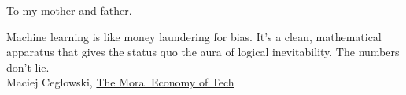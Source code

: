 

\copyrightpage  %

\commcertpage   %

\titlepage      %

\begin{dedication}		%
\begin{center}
    To my mother and father.
\end{center}
\end{dedication}

\begin{epigraph}		%
    \begin{center}
        Machine learning is like money laundering for bias.  It’s a clean, mathematical apparatus that gives the status quo the aura of logical inevitability. The numbers don’t lie.\\
        Maciej Ceglowski, \href{https://idlewords.com/talks/sase_panel.htm}{The Moral Economy of Tech}
    \end{center}
\end{epigraph}

